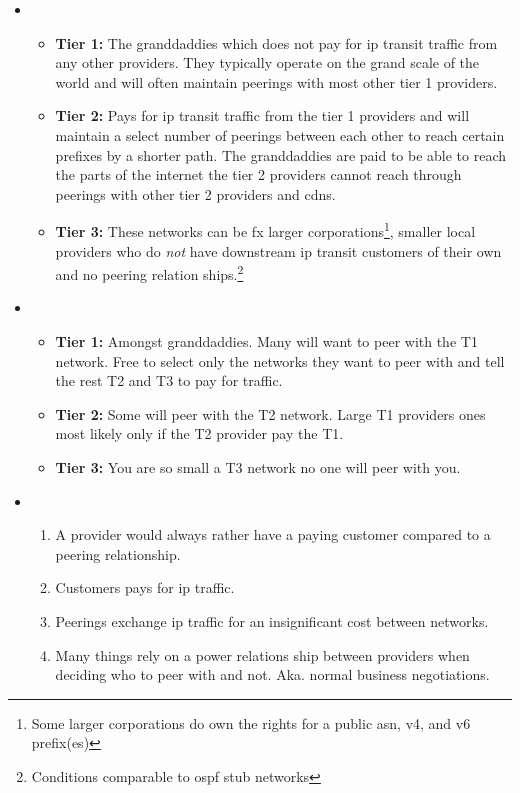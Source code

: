 \begin{itemize}
    \item {}
    \begin{itemize}
        \item \textbf{Tier 1:} The granddaddies which does not pay for \Gls{ip} transit traffic from any other providers. They typically operate on the grand scale of the world and will often maintain peerings with most other tier 1 providers.
        \item \textbf{Tier 2:} Pays for \Gls{ip} transit traffic from the tier 1 providers and will maintain a select number of peerings between each other to reach certain prefixes by a shorter path. The granddaddies are paid to be able to reach the parts of the internet the tier 2 providers cannot reach through peerings with other tier 2 providers and \Glspl{cdn}.
        \item \textbf{Tier 3:} These networks can be fx larger corporations\footnote{Some larger corporations do own the rights for a public \Gls{asn}, v4, and v6 prefix(es)}, smaller local providers who do \textit{not} have downstream \Gls{ip} transit customers of their own and no peering relation ships.\footnote{Conditions comparable to \Gls{ospf} stub networks}
    \end{itemize}
    \item {}
    \begin{itemize}
        \item \textbf{Tier 1:} Amongst granddaddies. Many will want to peer with the T1 network. Free to select only the networks they want to peer with and tell the rest T2 and T3 to pay for traffic.
        \item \textbf{Tier 2:} Some will peer with the T2 network. Large T1 providers ones most likely only if the T2 provider pay the T1.
        \item \textbf{Tier 3:} You are so small a T3 network no one will peer with you.
    \end{itemize}
    \item {}
    \begin{enumerate}
        \item A provider would always rather have a paying customer compared to a peering relationship.
        \item Customers pays for \Gls{ip} traffic.
        \item Peerings exchange \Gls{ip} traffic for an insignificant cost between networks.
        \item Many things rely on a power relations ship between providers when deciding who to peer with and not. Aka. normal business negotiations.
    \end{enumerate}
\end{itemize}


